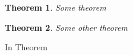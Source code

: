 \documentclass{article}
\newtheorem{theorem}{Theorem}
\begin{document}
\begin{theorem} \label{tm:1}
    Some theorem
\end{theorem}
\begin{theorem} \label{tm:2}
    Some other theorem
\end{theorem}

In Theorem 









\end{document}
